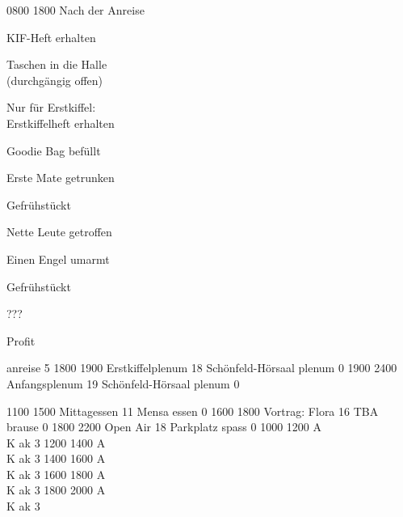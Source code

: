 \documentclass[a5paper,9pt]{scrreprt}
\newcommand{\cmark}{\ding{51}}%
\newcommand{\done}{\rlap{$\square$}{\raisebox{2pt}{\large\hspace{1pt}\cmark}}%
\hspace{-2.5pt}}
\begin{document}
\begin{center}
\begin{timetable}
   {0800} {1800} {Nach der Anreise}
  {\begin{todolist}[leftmargin=*]
  \addtolength\itemsep{-1pt}
    \item[\done] KIF-Heft erhalten
    \item Taschen in die Halle\\\vspace{2pt}(durchgängig offen)
    \item Nur für Erstkiffel:\\\vspace{2pt}Erstkiffelheft erhalten
    \item Goodie Bag befüllt
    \item Erste Mate getrunken
    \item Gefrühstückt
    \item Nette Leute getroffen
    \item Einen Engel umarmt
    \item Gefrühstückt
    \item ???
    \item Profit
   \end{todolist}}
    {} {} {anreise}  {5}
   {1800} {1900} {Erstkiffelplenum} {18} {Schönfeld-Hörsaal} {} {plenum}  {0}
   {1900} {2400} {Anfangsplenum}    {19} {Schönfeld-Hörsaal} {} {plenum}  {0}

   {1100} {1500} {Mittagessen}      {11} {Mensa}        {} {essen}   {0}
   {1600} {1800} {Vortrag: Flora}   {16} {TBA}               {} {brause}  {0}
   {1800} {2200} {Open Air}         {18} {Parkplatz}         {} {spass}   {0}
   {1000} {1200} {\hfill A\\ \hfill K} {} {}               {} {ak}      {3}
   {1200} {1400} {\hfill A\\ \hfill K} {} {}               {} {ak}      {3}
   {1400} {1600} {\hfill A\\ \hfill K} {} {}               {} {ak}      {3}
   {1600} {1800} {\hfill A\\ \hfill K} {} {}               {} {ak}      {3}
   {1800} {2000} {\hfill A\\ \hfill K} {} {}               {} {ak}      {3}


\end{timetable}
\end{center}
\end{document}
